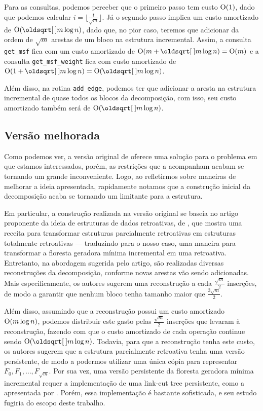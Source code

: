 Para as consultas, podemos perceber que o primeiro passo tem custo $\mathrm{O}(1)$, dado que podemos calcular $i = \lfloor \frac{t}{\sqrt{m}} \rfloor$. Já o segundo passo implica um custo amortizado de $\Oh(\sqrt{m} \log n)$, dado que, no pior caso, teremos que adicionar da ordem de $\sqrt{m}$ arestas de um bloco na estrutura incremental. Assim, a consulta \texttt{get\_msf} fica com um custo amortizado de $\Oh(m + \sqrt{m} \log n) = \Oh(m)$ e a consulta \texttt{get\_msf\_weight} fica com custo amortizado de $\Oh(1 + \sqrt{m} \log n) = \Oh(\sqrt{m} \log n)$.

Além disso, na rotina \texttt{add\_edge}, podemos ter que adicionar a aresta na estrutura incremental de quase todos os blocos da decomposição, com isso, seu custo amortizado também será de $\Oh(\sqrt{m} \log n)$.

\subsection{Versão melhorada}
\label{sec:rmsf-versao-mel}

Como podemos ver, a versão original de \citet{10.1093/comjnl/bxaa135} oferece uma solução para o problema em que estamos interessados, porém, as restrições que a acompanham acabam se tornando um grande inconveniente. Logo, ao refletirmos sobre maneiras de melhorar a ideia apresentada, rapidamente notamos que a construção inicial da decomposição acaba se tornando um limitante para a estrutura.

Em particular, a construção realizada na versão original se baseia no artigo proponente da ideia de estruturas de dados retroativas, de \citet{10.1145/1240233.1240236}, que mostra uma receita para transformar estruturas parcialmente retroativas em estruturas totalmente retroativas --- traduzindo para o nosso caso, uma maneira para transformar a floresta geradora mínima incremental em uma retroativa. Entretanto, na abordagem sugerida pelo artigo, são realizadas diversas reconstruções da decomposição, conforme novas arestas vão sendo adicionadas. Mais especificamente, os autores sugerem uma reconstrução a cada $\frac{\sqrt{m}}{2}$ inserções, de modo a garantir que nenhum bloco tenha tamanho maior que $\frac{3\sqrt{m}}{2}$.

Além disso, assumindo que a reconstrução possui um custo amortizado $\mathrm{O}(m \log n)$, podemos distribuir este gasto pelas $\frac{\sqrt{m}}{2}$ inserções que levaram à reconstrução, fazendo com que o custo amortizado de cada operação continue sendo $\Oh(\sqrt{m} \log n)$. Todavia, para que a reconstrução tenha este custo, os autores sugerem que a estrutura parcialmente retroativa tenha uma versão persistente, de modo a  podermos utilizar uma única cópia para representar $F_0, F_1, \dots, F_{\sqrt{m}}$. Por sua vez, uma versão persistente da floresta geradora mínima incremental requer a implementação de uma link-cut tree persistente, como a apresentada por \citet{10.1007/978-3-540-69903-3_16}. Porém, essa implementação é bastante sofisticada, e seu estudo fugiria do escopo deste trabalho.

